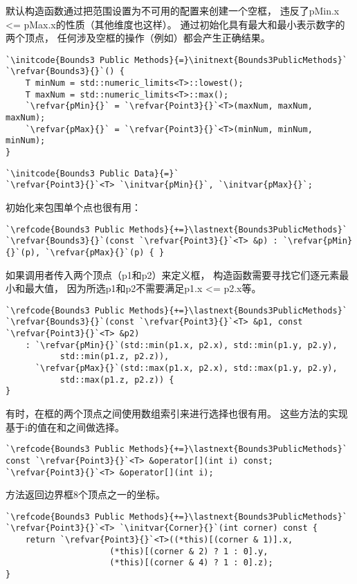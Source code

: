 默认构造函数通过把范围设置为不可用的配置来创建一个空框，
违反了{\ttfamily pMin.x <= pMax.x}的性质（其他维度也这样）。
通过初始化具有最大和最小表示数字的两个顶点，
任何涉及空框的操作（例如）都会产生正确结果。
\begin{lstlisting}
`\initcode{Bounds3 Public Methods}{=}\initnext{Bounds3PublicMethods}`
`\refvar{Bounds3}{}`() {
    T minNum = std::numeric_limits<T>::lowest();
    T maxNum = std::numeric_limits<T>::max();
    `\refvar{pMin}{}` = `\refvar{Point3}{}`<T>(maxNum, maxNum, maxNum);
    `\refvar{pMax}{}` = `\refvar{Point3}{}`<T>(minNum, minNum, minNum);
}
\end{lstlisting}

\begin{lstlisting}
`\initcode{Bounds3 Public Data}{=}`
`\refvar{Point3}{}`<T> `\initvar{pMin}{}`, `\initvar{pMax}{}`;
\end{lstlisting}

初始化来包围单个点也很有用：
\begin{lstlisting}
`\refcode{Bounds3 Public Methods}{+=}\lastnext{Bounds3PublicMethods}`
`\refvar{Bounds3}{}`(const `\refvar{Point3}{}`<T> &p) : `\refvar{pMin}{}`(p), `\refvar{pMax}{}`(p) { }
\end{lstlisting}

如果调用者传入两个顶点（{\ttfamily p1}和{\ttfamily p2}）来定义框，
构造函数需要寻找它们逐元素最小和最大值，
因为所选{\ttfamily p1}和{\ttfamily p2}不需要满足{\ttfamily p1.x <= p2.x}等。
\begin{lstlisting}
`\refcode{Bounds3 Public Methods}{+=}\lastnext{Bounds3PublicMethods}`
`\refvar{Bounds3}{}`(const `\refvar{Point3}{}`<T> &p1, const `\refvar{Point3}{}`<T> &p2)
    : `\refvar{pMin}{}`(std::min(p1.x, p2.x), std::min(p1.y, p2.y),
           std::min(p1.z, p2.z)),
      `\refvar{pMax}{}`(std::max(p1.x, p2.x), std::max(p1.y, p2.y),
           std::max(p1.z, p2.z)) {
}
\end{lstlisting}

有时，在框的两个顶点之间使用数组索引来进行选择也很有用。
这些方法的实现基于{\ttfamily i}的值在和之间做选择。
\begin{lstlisting}
`\refcode{Bounds3 Public Methods}{+=}\lastnext{Bounds3PublicMethods}`
const `\refvar{Point3}{}`<T> &operator[](int i) const;
`\refvar{Point3}{}`<T> &operator[](int i);
\end{lstlisting}

方法返回边界框8个顶点之一的坐标。
\begin{lstlisting}
`\refcode{Bounds3 Public Methods}{+=}\lastnext{Bounds3PublicMethods}`
`\refvar{Point3}{}`<T> `\initvar{Corner}{}`(int corner) const {
    return `\refvar{Point3}{}`<T>((*this)[(corner & 1)].x,
                     (*this)[(corner & 2) ? 1 : 0].y,
                     (*this)[(corner & 4) ? 1 : 0].z);
}
\end{lstlisting}

